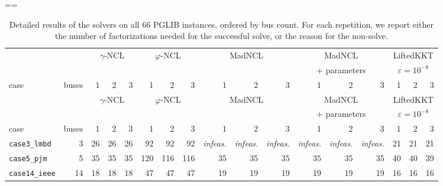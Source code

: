 \clearpage
\pdfpagewidth=\paperheight \pdfpageheight=\paperwidth
{}
{\footnotesize\setlength{\tabcolsep}{2.5pt}
\begin{longtable}{lrrrrrrrrrrrrrrrr}
\caption{Detailed results of the solvers on all 66 PGLIB instances, ordered by bus count. For each repetition, we report either the number of factorizations needed for the successful solve, or the reason for the non-solve.}\label{tab:pglib-appendix}\\
\toprule
 &  & \multicolumn{3}{c}{$\gamma$-NCL} & \multicolumn{3}{c}{$\varphi$-NCL} & \multicolumn{3}{c}{MadNCL} & \multicolumn{3}{c}{MadNCL} & \multicolumn{3}{c}{LiftedKKT} \\
 &  & \multicolumn{3}{c}{} & \multicolumn{3}{c}{} & \multicolumn{3}{c}{} & \multicolumn{3}{c}{+ parameters} & \multicolumn{3}{c}{$\varepsilon=10^{-8}$} \\
\cmidrule(lr){3-5} \cmidrule(lr){6-8} \cmidrule(lr){9-11} \cmidrule(lr){12-14} \cmidrule(lr){15-17}
case & buses & 1 & 2 & 3 & 1 & 2 & 3 & 1 & 2 & 3 & 1 & 2 & 3 & 1 & 2 & 3 \\\midrule
\endfirsthead
\toprule
 &  & \multicolumn{3}{c}{$\gamma$-NCL} & \multicolumn{3}{c}{$\varphi$-NCL} & \multicolumn{3}{c}{MadNCL} & \multicolumn{3}{c}{MadNCL} & \multicolumn{3}{c}{LiftedKKT} \\
 &  & \multicolumn{3}{c}{} & \multicolumn{3}{c}{} & \multicolumn{3}{c}{} & \multicolumn{3}{c}{+ parameters} & \multicolumn{3}{c}{$\varepsilon=10^{-8}$} \\
\cmidrule(lr){3-5} \cmidrule(lr){6-8} \cmidrule(lr){9-11} \cmidrule(lr){12-14} \cmidrule(lr){15-17}
case & buses & 1 & 2 & 3 & 1 & 2 & 3 & 1 & 2 & 3 & 1 & 2 & 3 & 1 & 2 & 3 \\\midrule
\endhead
\bottomrule
\endfoot
\texttt{case3\_lmbd} & 3 & 26 & 26 & 26 & 92 & 92 & 92 & \textit{infeas.} & \textit{infeas.} & \textit{infeas.} & \textit{infeas.} & \textit{infeas.} & \textit{infeas.} & 21 & 21 & 21 \\
\texttt{case5\_pjm} & 5 & 35 & 35 & 35 & 120 & 116 & 116 & 35 & 35 & 35 & 35 & 35 & 35 & 40 & 40 & 39 \\
\texttt{case14\_ieee} & 14 & 18 & 18 & 18 & 47 & 47 & 47 & 19 & 19 & 19 & 19 & 19 & 19 & 16 & 16 & 16 \\

\end{longtable}}
